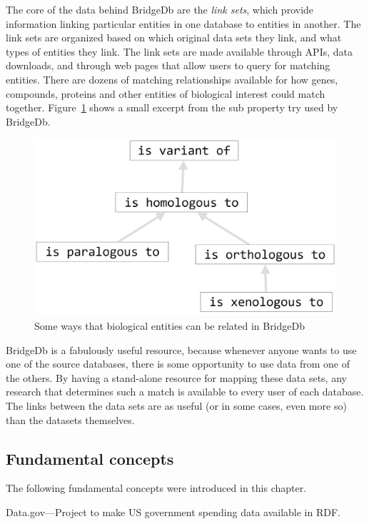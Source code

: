 The core of the data behind BridgeDb are the \emph{link sets}, which provide information linking
particular entities in one database to entities in another.  The link sets are organized based on 
which original data sets they link, and what types of entities they link.  The link sets are made available 
through APIs, data downloads, and through web pages that allow users to query for matching 
entities.  There are dozens of matching relationships available for how genes, compounds, proteins and 
other entities of biological interest could match together.  Figure~\ref{Fig:ch10.3} shows a small excerpt
from the sub property try used by BridgeDb. 

\begin{figure}
    \centering
    \includegraphics[width=5in]{SWWOv3/media/ch10/figure10-6.png}
    \caption{Some ways that biological entities can be related in BridgeDb}
    \label{Fig:ch10.3}
\end{figure}

BridgeDb is a fabulously useful resource, because whenever anyone wants to use one of the
source databases, there is some opportunity to use data from one of the others.  By having a 
stand-alone resource for mapping these data sets, any research that determines such 
a match is available to every user of each database.  The links between the data sets are 
as useful (or in some cases, even more so) than the datasets themselves. 




\subsection{Fundamental concepts}

The following fundamental concepts were introduced in this chapter.

Data.gov---Project to make US government spending data available in RDF.

